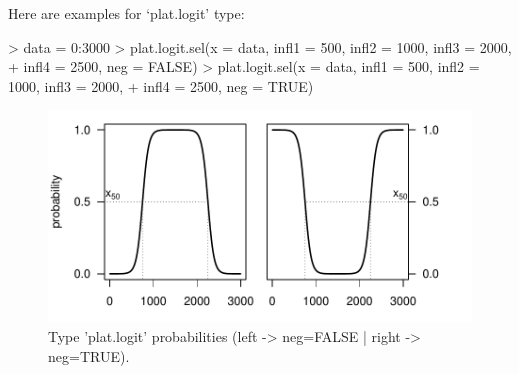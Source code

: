 \documentclass[letterpaper, 12pt]{article}
\begin{document}
Here are examples for `plat.logit' type:
\begin{Schunk}
\begin{Sinput}
> data = 0:3000
> plat.logit.sel(x = data, infl1 = 500, infl2 = 1000, infl3 = 2000, 
+     infl4 = 2500, neg = FALSE)
> plat.logit.sel(x = data, infl1 = 500, infl2 = 1000, infl3 = 2000, 
+     infl4 = 2500, neg = TRUE)
\end{Sinput}
\end{Schunk}
\begin{figure}[h]
\vspace{-20pt}
\begin{center}
\includegraphics{relation_sel-029}
\end{center}
\vspace{-30pt}
\caption{Type 'plat.logit' probabilities (left -> neg=FALSE |  right -> neg=TRUE).}
\vspace{-10pt}
\label{fig14}
\end{figure}
\end{document}
